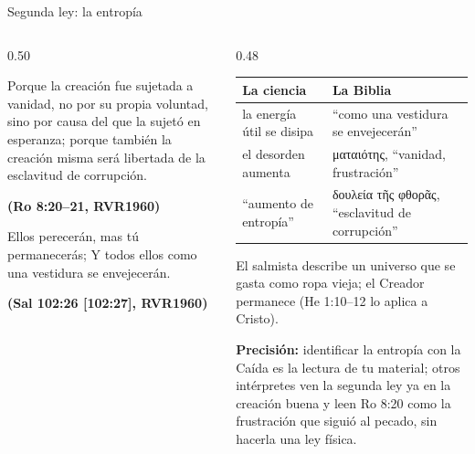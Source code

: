 \documentclass[hyperref={bookmarks=false},aspectratio=169]{beamer}
\newcommand{\grc}[1]{\foreignlanguage{ancientgreek}{#1}}
\newcommand{\fuente}[1]{\par\hfill{\upshape\bfseries\footnotesize\textcolor{azul}{#1}}}
\newcommand{\precision}[1]{{\footnotesize\color{gris}\textbf{Precisión:} #1}}
\begin{document}
\begin{frame}{Segunda ley: la entropía}
\begin{columns}[t,onlytextwidth]
\begin{column}{0.50\textwidth}
\begin{cita}Porque la creación fue sujetada a vanidad, no por su propia voluntad, sino por causa del que la sujetó en esperanza; porque también la creación misma será libertada de la esclavitud de corrupción.\fuente{(Ro 8:20--21, RVR1960)}\end{cita}
\begin{cita}Ellos perecerán, mas tú permanecerás; Y todos ellos como una vestidura se envejecerán.\fuente{(Sal 102:26 [102:27], RVR1960)}\end{cita}
\end{column}
\begin{column}{0.48\textwidth}
\scriptsize\renewcommand{\arraystretch}{1.15}
\begin{tabular}{@{}>{\RaggedRight\arraybackslash}p{2.3cm}>{\RaggedRight\arraybackslash}p{3.0cm}@{}}
\toprule
\textbf{La ciencia} & \textbf{La Biblia} \\ \midrule
la energía útil se disipa & ``como una vestidura se envejecerán'' \\
el desorden aumenta & \grc{ματαιότης}, ``vanidad, frustración'' \\
``aumento de entropía'' & \grc{δουλεία τῆς φθορᾶς}, ``esclavitud de corrupción'' \\
\bottomrule
\end{tabular}\par\medskip
\small El salmista describe un universo que se gasta como ropa vieja; el Creador permanece (He 1:10--12 lo aplica a Cristo).\par\smallskip
\precision{identificar la entropía con la Caída es la lectura de tu material; otros intérpretes ven la segunda ley ya en la creación buena y leen Ro 8:20 como la frustración que siguió al pecado, sin hacerla una ley física.}
\end{column}
\end{columns}
\end{frame}
\end{document}
